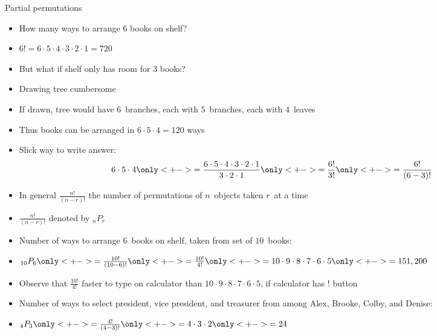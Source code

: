 \documentclass{beamer}
\theoremstyle{definition}
\begin{document}
\begin{frame}{Partial permutations}
\begin{itemize}
\item How many ways to arrange $6$ books on shelf?
\item $6!=6\cdot 5\cdot 4\cdot 3\cdot 2\cdot 1=720$
\item But what if shelf only has room for $3$ books?
\item Drawing tree cumbersome
\item If drawn, tree would have $6$~branches,
each with $5$~branches, each with $4$~leaves
\item Thus books can be arranged in $6\cdot 5\cdot 4=120$ ways
\item Slick way to write answer:
\[6\cdot 5\cdot 4
\only<+->{=\frac{6\cdot 5\cdot 4\cdot 3\cdot 2\cdot 1}
{3\cdot 2\cdot 1}}\only<+->{=\frac{6!}{3!}}
\only<+->{=\frac{6!}{\left(6-3\right)!}}\]
\item In general
$\frac{n!}{\left(n-r\right)!}$ the number of \alert{permutations
of $n$~objects taken $r$~at a time}
\item $\frac{n!}{\left(n-r\right)!}$ denoted
by $_nP_r$
\end{itemize}
\end{frame}

\begin{frame}
\begin{example}
\begin{itemize}
\item Number of ways to arrange $6$~books
on shelf, taken from set of $10$~books:
\item $_{10}P_6
\only<+->{=\frac{10!}{\left(10-6\right)!}}
\only<+->{=\frac{10!}{4!}}
\only<+->{=10\cdot 9\cdot 8\cdot 7\cdot 6\cdot 5}
\only<+->{=151,200}$
\item Observe that $\frac{10!}{4!}$ faster to type
on calculator than 
$10\cdot 9\cdot 8\cdot 7\cdot 6\cdot 5$, if calculator
has $!$ button
\end{itemize}
\end{example}
\begin{example}
\begin{itemize}
\item Number of ways to select president, vice president,
and treasurer from among Alex, Brooke, Colby, and Denise:
\item $_4P_3
\only<+->{=\frac{4!}{\left(4-3\right)!}}
\only<+->{=4\cdot 3\cdot 2}
\only<+->{=24}$
\end{itemize}
\end{example}
\end{frame}
\end{document}
